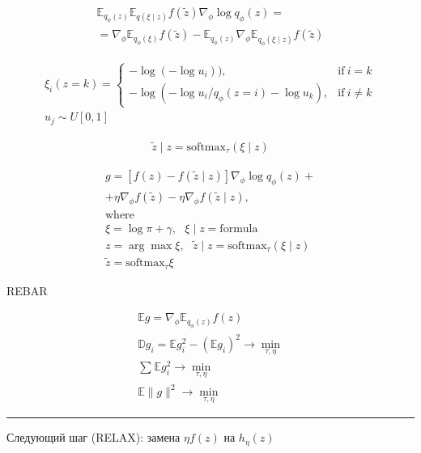 \documentclass{book}
\begin{document}
\begin{gather*}
    \mathbb{E}_{q_\phi(z)}\mathbb{E}_{q(\xi\mid z)}f(\tilde{z})\nabla_\phi\log q_\phi(z)=\\
    =\nabla_\phi \mathbb{E}_{q_\phi(\xi)}f(\tilde{z})-\mathbb{E}_{q_\phi(z)}\nabla_\phi\mathbb{E}_{q_\phi(\xi\mid z)}f(\tilde{z})
\end{gather*}

\begin{gather*}
    \xi_i(z=k)=
    \begin{cases}
        -\log(-\log u_i)),&\mathrm{if}~i=k\\
        -\log(-\log u_i/q_\phi(z=i)-\log u_k),&\mathrm{if}~i\neq k
    \end{cases}\\
    u_j\sim U[0,1]
\end{gather*}

\begin{gather*}
    \tilde{z}\mid z=\mathrm{softmax}_\tau(\xi\mid z)
\end{gather*}

\begin{gather*}
    g=[f(z)-f(\tilde{z}\mid z)]\nabla_\phi\log q_\phi(z)+\\
    +\eta\nabla_\phi f(\tilde{z})-\eta \nabla_\phi f(\tilde{z}\mid z),\\
    \textrm{where}\\
    \xi=\log\pi+\gamma,~~~\xi\mid z=\mathrm{formula}\\
    z=\arg\max\xi,~~~\tilde{z}\mid z=\mathrm{softmax}_\tau(\xi\mid z)\\
    \tilde{z}=\mathrm{softmax}_\tau\xi
\end{gather*}

REBAR

\begin{gather*}
    \mathbb{E}g=\nabla_{\phi} \mathbb{E}_{q_\phi(z)}f(z)\\
    \mathbb{D}g_i=\mathbb{E}g_i^2-\left(\mathbb{E}g_i\right)^2\rightarrow\min_{\tau,\eta}\\
    \sum_{}^{} {\mathbb{E}g_i^2}\rightarrow\min_{\tau,\eta}\\
    {\mathbb{E}\|g\|^2}\rightarrow\min_{\tau,\eta}
\end{gather*}

\hrule

Следующий шаг (RELAX): замена $\eta f(z)$ на $h_\eta(z)$
\end{document}
